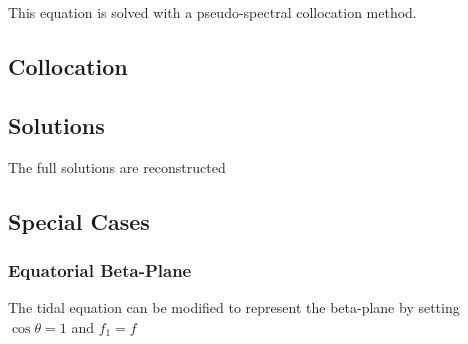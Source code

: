 \documentclass[12pt]{article}
\begin{document}
This equation is solved with a pseudo-spectral collocation method.

\subsection*{Collocation}

\citep{wang2016hough}

\subsection*{Solutions}

The full solutions are reconstructed

\subsection*{Special Cases}

\subsubsection{Equatorial Beta-Plane}

The tidal equation can be modified to represent the beta-plane by setting $\cos \theta = 1$ and $f_{1} = f$
\end{document}
